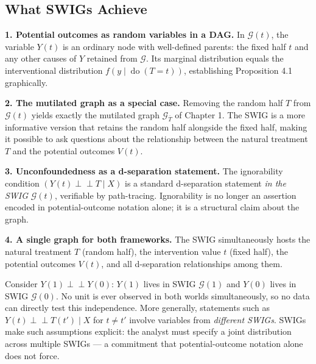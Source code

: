 \documentclass[
  a4paper,
]{book}
\newcommand{\doop}{\operatorname{do}}
\newcommand{\indep}{\perp\!\!\!\perp}
\newcommand{\Gcal}{\mathcal{G}}
\begin{document}
\subsection{What SWIGs Achieve}\label{sec-swig-achieve}

\textbf{1. Potential outcomes as random variables in a DAG.} In
\(\Gcal(t)\), the variable \(Y(t)\) is an ordinary node with
well-defined parents: the fixed half \(t\) and any other causes of \(Y\)
retained from \(\Gcal\). Its marginal distribution equals the
interventional distribution \(f(y \mid \doop(T{=}t))\), establishing
Proposition 4.1 graphically.

\textbf{2. The mutilated graph as a special case.} Removing the random
half \(T\) from \(\Gcal(t)\) yields exactly the mutilated graph
\(\Gcal_{\overline{T}}\) of Chapter 1. The SWIG is a more informative
version that retains the random half alongside the fixed half, making it
possible to ask questions about the relationship between the natural
treatment \(T\) and the potential outcomes \(V(t)\).

\textbf{3. Unconfoundedness as a d-separation statement.} The
ignorability condition \((Y(t) \indep T \mid X)\) is a standard
d-separation statement \emph{in the SWIG} \(\Gcal(t)\), verifiable by
path-tracing. Ignorability is no longer an assertion encoded in
potential-outcome notation alone; it is a structural claim about the
graph.

\textbf{4. A single graph for both frameworks.} The SWIG simultaneously
hosts the natural treatment \(T\) (random half), the intervention value
\(t\) (fixed half), the potential outcomes \(V(t)\), and all
d-separation relationships among them.

\begin{tcolorbox}[enhanced jigsaw, arc=.35mm, bottomrule=.15mm, bottomtitle=1mm, breakable, colback=white, colbacktitle=quarto-callout-warning-color!10!white, colframe=quarto-callout-warning-color-frame, coltitle=black, left=2mm, leftrule=.75mm, opacityback=0, opacitybacktitle=0.6, rightrule=.15mm, title={Cross-World Independence and Its Limits}, titlerule=0mm, toprule=.15mm, toptitle=1mm]

Consider \(Y(1) \indep Y(0)\): \(Y(1)\) lives in SWIG \(\Gcal(1)\) and
\(Y(0)\) lives in SWIG \(\Gcal(0)\). No unit is ever observed in both
worlds simultaneously, so no data can directly test this independence.
More generally, statements such as \(Y(t) \indep T(t') \mid X\) for
\(t \neq t'\) involve variables from \emph{different SWIGs}. SWIGs make
such assumptions explicit: the analyst must specify a joint distribution
across multiple SWIGs --- a commitment that potential-outcome notation
alone does not force.

\end{tcolorbox}
\end{document}
